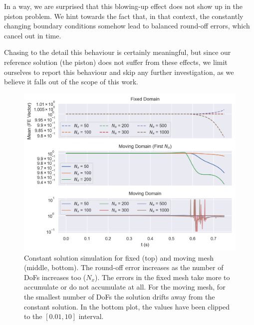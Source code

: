 \documentclass[../../thesis.tex]{subfiles}
\begin{document}
In a way, we are surprised that this blowing-up effect does not show up in the piston problem.
We hint towards the fact that, in that context, the constantly changing boundary conditions
somehow lead to balanced round-off errors, which cancel out in time.

Chasing to the detail this behaviour is certainly meaningful, 
but since our reference solution (the piston) does not suffer from these effects,
we limit ourselves to report this behaviour and skip any further investigation, 
as we believe it falls out of the scope of this work. 

\newpage
\begin{figure}[h]
    \centering
    \includegraphics[width=1\columnwidth]{research_project/piston/figures/ale_effect/mean_fe_comparison_constant_solution.png}
    \caption{Constant solution simulation for fixed (top) and moving mesh (middle, bottom).
    The round-off error increases as the number of DoFs increases too ($N_x$). 
    The errors in the fixed mesh take more to accumulate or do not accumulate at all.
    For the moving mesh, for the smallest number of DoFs the solution drifts away from the constant solution.
    In the bottom plot, the values have been clipped to the $[0.01, 10]$ interval.}
    \label{fig:ale_effect_constant_solution}
\end{figure}



\end{document}
